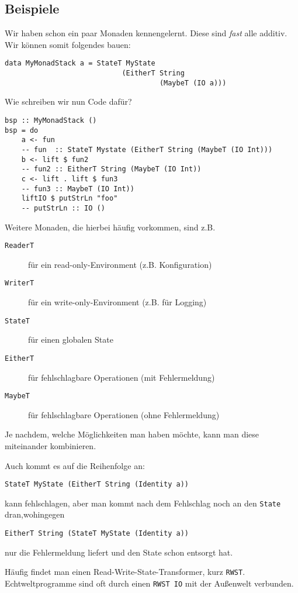 \documentclass{beamer}
\begin{document}
\subsection{Beispiele}

\begin{frame}[fragile]
Wir haben schon ein paar Monaden kennengelernt. Diese sind \emph{fast} alle additiv. Wir können somit folgendes bauen:\bigskip

\pause
\begin{verbatim}
data MyMonadStack a = StateT MyState 
                            (EitherT String 
                                     (MaybeT (IO a)))
\end{verbatim}
\pause
Wie schreiben wir nun Code dafür?
\begin{verbatim}
bsp :: MyMonadStack ()
bsp = do
    a <- fun                
    -- fun  :: StateT Mystate (EitherT String (MaybeT (IO Int)))
    b <- lift $ fun2        
    -- fun2 :: EitherT String (MaybeT (IO Int))
    c <- lift . lift $ fun3 
    -- fun3 :: MaybeT (IO Int))
    liftIO $ putStrLn "foo"
    -- putStrLn :: IO ()
\end{verbatim}
\end{frame}

\begin{frame}[fragile]
Weitere Monaden, die hierbei häufig vorkommen, sind z.B.
\begin{description}
 \item[\texttt{ReaderT}] für ein read-only-Environment (z.B. Konfiguration)
 \pause
 \item[\texttt{WriterT}] für ein write-only-Environment (z.B. für Logging)
 \pause
 \item[\texttt{StateT}] für einen globalen State
 \pause
 \item[\texttt{EitherT}] für fehlschlagbare Operationen (mit Fehlermeldung)
 \pause
 \item[\texttt{MaybeT}] für fehlschlagbare Operationen (ohne Fehlermeldung)
\end{description}
\pause
\bigskip

Je nachdem, welche Möglichkeiten man haben möchte, kann man diese miteinander kombinieren.
\end{frame}

\begin{frame}[fragile]
Auch kommt es auf die Reihenfolge an:
\begin{verbatim}
StateT MyState (EitherT String (Identity a))
\end{verbatim}
kann fehlschlagen, aber man kommt nach dem Fehlschlag noch an den \texttt{State} dran,\pause wohingegen
\begin{verbatim}
EitherT String (StateT MyState (Identity a))
\end{verbatim}
nur die Fehlermeldung liefert und den State schon entsorgt hat.\\\par
\pause
Häufig findet man einen Read-Write-State-Transformer, kurz \texttt{RWST}.\\
\pause
Echtweltprogramme sind oft durch einen \texttt{RWST IO} mit der Außenwelt verbunden.
\end{frame}
\end{document}
